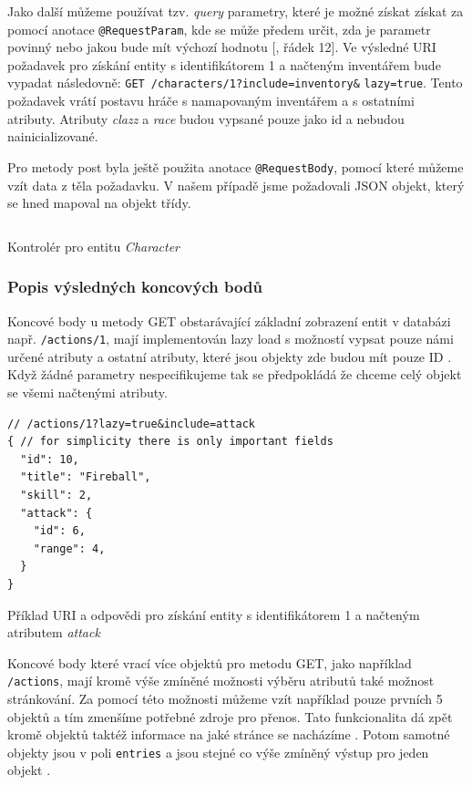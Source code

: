 Jako další můžeme používat tzv. \textit{query} parametry, které je možné získat získat za pomocí anotace \texttt{@RequestParam}, kde se může předem určit, zda je parametr povinný nebo jakou bude mít výchozí hodnotu [, řádek 12]. Ve výsledné URI požadavek pro získání entity s identifikátorem 1 a načteným inventářem bude vypadat následovně: \texttt{GET /characters/1?include=inventory\&} \texttt{lazy=true}. Tento požadavek vrátí postavu hráče s namapovaným inventářem a s ostatními atributy. Atributy \textit{clazz} a \textit{race} 
budou vypsané pouze jako id a nebudou nainicializované.

Pro metody post byla ještě použita anotace \texttt{@RequestBody}, pomocí které můžeme vzít data z těla požadavku. V našem případě jsme požadovali JSON objekt, který se hned mapoval na objekt třídy.

\begin{listing}[h!]
    \inputminted[]{Java}{resources/code/impl/CharacterController.java}
    \caption{Kontrolér pro entitu \textit{Character}}
    \label{code:characterController}
\end{listing}

\subsubsection*{Popis výsledných koncových bodů} %
Koncové body u metody GET obstarávající základní zobrazení entit v databázi např. \texttt{/actions/1}, mají implementován lazy load  s možností vypsat pouze námi určené atributy a ostatní atributy, které jsou objekty zde budou mít pouze ID . Když žádné parametry nespecifikujeme tak se předpokládá že chceme celý objekt se všemi načtenými atributy.

\begin{listing}[H]
    \begin{verbatim}
// /actions/1?lazy=true&include=attack 
{ // for simplicity there is only important fields
  "id": 10,
  "title": "Fireball",
  "skill": 2,
  "attack": {
    "id": 6,
    "range": 4,
  }
}
    \end{verbatim}
    \caption{Příklad URI a odpovědi pro získání entity s identifikátorem 1 a načteným atributem \textit{attack}}
    \label{code:action:endpoint:single}
\end{listing}

Koncové body které vrací více objektů pro metodu GET, jako například \texttt{/actions}, mají kromě výše zmíněné možnosti výběru atributů také možnost stránkování. Za pomocí této možnosti můžeme vzít například pouze prvních 5 objektů a tím zmenšíme potřebné zdroje pro přenos. Tato funkcionalita dá zpět kromě objektů taktéž informace na jaké stránce se nacházíme . Potom samotné objekty jsou v poli \texttt{entries} a jsou stejné co výše zmíněný výstup pro jeden objekt .

